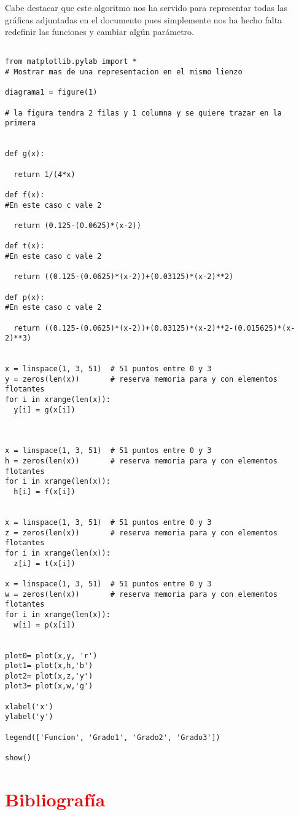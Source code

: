 \documentclass[a4paper,12pt]{article}
\begin{document}
Cabe destacar que este algoritmo nos ha servido para representar todas las gráficas adjuntadas en el documento pues simplemente nos ha hecho falta redefinir las funciones
y cambiar algún parámetro. 





\begin{verbatim}

from matplotlib.pylab import *
# Mostrar mas de una representacion en el mismo lienzo 

diagrama1 = figure(1)

# la figura tendra 2 filas y 1 columna y se quiere trazar en la primera


def g(x):
  
  return 1/(4*x)
  
def f(x):
#En este caso c vale 2
  
  return (0.125-(0.0625)*(x-2))
  
def t(x):
#En este caso c vale 2
  
  return ((0.125-(0.0625)*(x-2))+(0.03125)*(x-2)**2)
  
def p(x):
#En este caso c vale 2
 
  return ((0.125-(0.0625)*(x-2))+(0.03125)*(x-2)**2-(0.015625)*(x-2)**3)
  

x = linspace(1, 3, 51)  # 51 puntos entre 0 y 3
y = zeros(len(x))       # reserva memoria para y con elementos flotantes
for i in xrange(len(x)):
  y[i] = g(x[i])



x = linspace(1, 3, 51)  # 51 puntos entre 0 y 3
h = zeros(len(x))       # reserva memoria para y con elementos flotantes
for i in xrange(len(x)):
  h[i] = f(x[i])
  
  
x = linspace(1, 3, 51)  # 51 puntos entre 0 y 3
z = zeros(len(x))       # reserva memoria para y con elementos flotantes
for i in xrange(len(x)):
  z[i] = t(x[i])
  
x = linspace(1, 3, 51)  # 51 puntos entre 0 y 3
w = zeros(len(x))       # reserva memoria para y con elementos flotantes
for i in xrange(len(x)):
  w[i] = p(x[i])
  

plot0= plot(x,y, 'r')
plot1= plot(x,h,'b')
plot2= plot(x,z,'y')
plot3= plot(x,w,'g')

xlabel('x')
ylabel('y')

legend(['Funcion', 'Grado1', 'Grado2', 'Grado3'])

show()

\end{verbatim}




\newpage
\section{\textcolor{red}{Bibliografía}}
\bigskip
\end{document}
